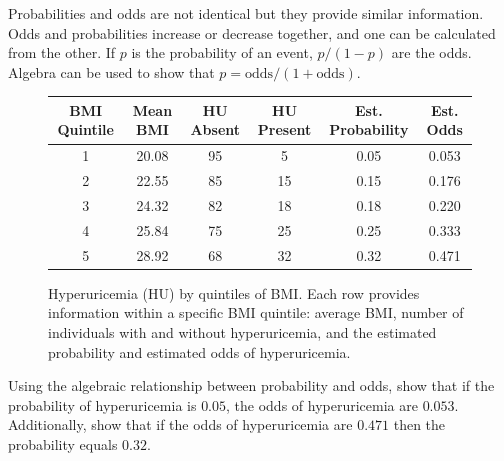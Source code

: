 Probabilities and odds are not identical but they provide similar information. Odds and probabilities increase or decrease together, and one can be calculated from the other.  If $p$ is the probability of an event, $p/(1 - p)$ are the odds.  Algebra can be used to show that $p = \textrm{odds} / (1 + \textrm{odds})$.

\begin{figure}[ht]
\centering
\begin{tabular}{cc|cc|cc}
  \hline
  \textbf{BMI Quintile} & \textbf{Mean BMI} & \textbf{HU Absent} & \textbf{HU Present} & \textbf{Est. Probability} & \textbf{Est. Odds} \\
  \hline
  1 & 20.08 & 95 & 5 & 0.05 & 0.053 \\
  2 & 22.55 & 85 & 15 & 0.15 & 0.176 \\
  3 & 24.32 & 82 & 18 & 0.18 & 0.220 \\
  4 & 25.84 & 75 & 25 & 0.25 & 0.333\\
  5 & 28.92 & 68 & 32 & 0.32 & 0.471\\
   \hline
\end{tabular}
\caption{Hyperuricemia (HU) by quintiles of BMI. Each row provides information within a specific BMI quintile: average BMI, number of individuals with and without hyperuricemia, and the estimated probability and estimated odds of hyperuricemia.}
\label{figure:huBMIQuintiles}
\end{figure}


\begin{exercisewrap}
\begin{nexercise}
  Using the algebraic relationship between probability and odds, show that if the probability of hyperuricemia is $0.05$, the odds of hyperuricemia are $0.053$. Additionally, show that if the odds of hyperuricemia are $0.471$ then the probability equals $0.32$.\footnotemark{}
\end{nexercise}
\end{exercisewrap}

